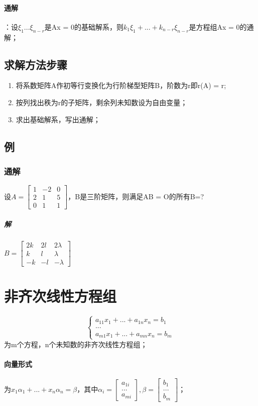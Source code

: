 \paragraph{通解}
：设\(\xi_1...\xi_{n - r}\)是Ax = 0的基础解系，则\(k_1\xi_1 + ... + k_{n - r}\xi_{n - r}\)是方程组Ax = 0的通解；

\subsection{求解方法步骤}
\begin{enumerate}
    \item 将系数矩阵A作初等行变换化为行阶梯型矩阵B，阶数为r即r(A) = r;
    \item 按列找出秩为r的子矩阵，剩余列未知数设为自由变量；
    \item 求出基础解系，写出通解；
\end{enumerate}


\subsection{例}

\subsubsection{通解}
设\(A = \begin{bmatrix}
    1 & -2 & 0 \\ 
    2 & 1 & 5 \\ 
    0 & 1 & 1
\end{bmatrix}\)，B是三阶矩阵，则满足AB = O的所有B=?
\subparagraph{解}
\(B = \begin{bmatrix}
    2k & 2l & 2\lambda \\ 
    k & l & \lambda \\ 
    -k & -l & -\lambda
\end{bmatrix}\)


\section{非齐次线性方程组}
\[
\begin{cases}
a_{11}x_1 + ... + a_{1n}x_n = b_1 \\ 
... \\ 
a_{m1}x_1 + ... + a_{mn}x_n = b_m
\end{cases}
\]为m个方程，n个未知数的非齐次线性方程组；

\paragraph{向量形式}为\(x_1\alpha_1 + ... + x_n\alpha_n = \beta\)，其中\(\alpha_i = \begin{bmatrix}
a_{1i} \\ 
... \\ 
a_{mi}
\end{bmatrix}, \beta = \begin{bmatrix}
b_1 \\ 
... \\ 
b_m
\end{bmatrix}\)；

